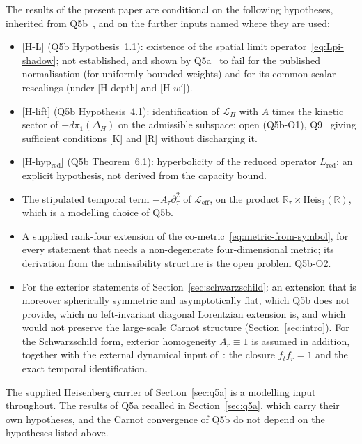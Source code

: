 \documentclass[11pt,a4paper]{article}
\begin{document}
  The results of the present paper are conditional on the following hypotheses, inherited from
  Q5b~\cite{Beau2026q5b}, and on the further inputs named where they are used:
  \begin{itemize}
    \item {[H-L]} (Q5b Hypothesis~1.1): existence of the spatial limit operator~\eqref{eq:Lpi-shadow}; not
    established, and shown by Q5a~\cite{Beau2026q5a} to fail for the published normalisation (for uniformly bounded
    weights) and for its common scalar rescalings (under [H-depth] and [H-$w'$]).
    \item {[H-lift]} (Q5b Hypothesis~4.1): identification of $\mathcal{L}_\Pi$ with $A$ times the kinetic sector of
    $-d\pi_1(\Delta_H)$ on the admissible subspace; open (Q5b-O1), Q9~\cite{Beau2026q9} giving sufficient conditions
    [K] and [R] without discharging it.
    \item {[H-hyp$_{\mathrm{red}}$]} (Q5b Theorem~6.1): hyperbolicity of the reduced operator $L_{\mathrm{red}}$; an
    explicit hypothesis, not derived from the capacity bound.
    \item The stipulated temporal term $-A_\tau\partial_\tau^2$ of $\mathcal{L}_{\mathrm{eff}}$, on the product
    $\mathbb{R}_\tau \times \mathrm{Heis}_3(\mathbb{R})$, which is a modelling choice of Q5b.
    \item A supplied rank-four extension of the co-metric~\eqref{eq:metric-from-symbol}, for every statement that
    needs a non-degenerate four-dimensional metric; its derivation from the admissibility structure is the open
    problem Q5b-O2.
    \item For the exterior statements of Section~\ref{sec:schwarzschild}: an extension that is moreover spherically
    symmetric and asymptotically flat, which Q5b does not provide, which no left-invariant diagonal Lorentzian extension
    is, and which would not preserve the large-scale Carnot structure (Section~\ref{sec:intro}).
    For the Schwarzschild form, exterior homogeneity $A_r \equiv 1$ is assumed in addition, together with the
    external dynamical input of~\cite{Beau2026c}: the closure $f_t f_r = 1$ and the exact temporal identification.
  \end{itemize}
  The supplied Heisenberg carrier of Section~\ref{sec:q5a} is a modelling input throughout.
  The results of Q5a recalled in Section~\ref{sec:q5a}, which carry their own hypotheses, and the Carnot convergence
  of Q5b do not depend on the hypotheses listed above.
\end{document}

